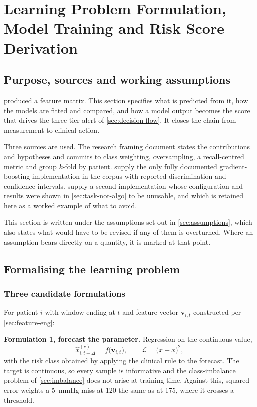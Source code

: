 \documentclass[12pt,a4paper,oneside]{report}
\begin{document}
\section{Learning Problem Formulation, Model Training and Risk Score Derivation}\label{sec:learning}

\subsection*{Purpose, sources and working assumptions}

 produced a feature matrix. This section specifies what is predicted from it, how the models are fitted and compared, and how a model output becomes the score that drives the three-tier alert of \cref{sec:decision-flow}. It closes the chain from measurement to clinical action.

Three sources are used. The research framing document states the contributions and hypotheses and commits to class weighting, oversampling, a recall-centred metric and group $k$-fold by patient. \Textcite{mendoza2025} supply the only fully documented gradient-boosting implementation in the corpus with reported discrimination and confidence intervals. \Textcite{efendi2025} supply a second implementation whose configuration and results were shown in \cref{sec:task-not-algo} to be unusable, and which is retained here as a worked example of what to avoid.

This section is written under the assumptions set out in \cref{sec:assumptions}, which also states what would have to be revised if any of them is overturned. Where an assumption bears directly on a quantity, it is marked at that point.

\subsection{Formalising the learning problem}\label{sec:formulation}

\subsubsection{Three candidate formulations}

For patient $i$ with window ending at $t$ and feature vector $\mathbf{v}_{i,t}$ constructed per \cref{sec:feature-eng}:

\textbf{Formulation 1, forecast the parameter.} Regression on the continuous value,
\begin{equation}
  \hat{x}^{(c)}_{i,t+\Delta} = f\bigl(\mathbf{v}_{i,t}\bigr),
  \qquad \mathcal{L} = \bigl(\hat{x} - x\bigr)^2,
\end{equation}
with the risk class obtained by applying the clinical rule to the forecast. The target is continuous, so every sample is informative and the class-imbalance problem of \cref{sec:imbalance} does not arise at training time. Against this, squared error weights a 5~mmHg miss at 120 the same as at 175, where it crosses a threshold.
\end{document}
